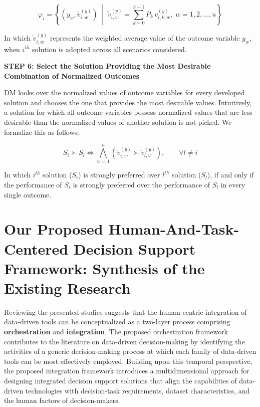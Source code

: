\documentclass{sfuthesis}
\begin{document}
\begin{equation}
\varphi_i
=
\left\{
(y_w,\tilde{v}_{i,w}^{(y)})
\;\middle|\;
\tilde{v}_{i,w}^{(y)}
=
\sum_{k=0}^{h-1}
P_k\,v_{i,k,w}^{(y)},
\;
w=1,2,\ldots,u
\right\}
\end{equation}

In which $\tilde{v}_{i,w}^{(y)}$ represents the weighted average value of the outcome variable $y_w$, when $i^{th}$ solution is adopted across all scenarios considered.

\textbf{STEP 6: Select the Solution Providing the Most Desirable Combination of
Normalized Outcomes}

DM looks over the normalized values of outcome variables for every developed solution
and chooses the one that provides the most desirable values. Intuitively, a solution for which all outcome variables possess normalized values that are less desirable than the normalized values of another solution is not picked. We formalize this as follows:

\begin{equation}
S_i \succ S_l
\iff
\bigwedge_{w=1}^{u}
\left(
\tilde{v}_{i,w}^{(y)}
\succ
\tilde{v}_{l,w}^{(y)}
\right),
\qquad
\forall l\neq i
\end{equation}

In which $i^{th}$ solution ($S_i$) is strongly preferred over $l^{th}$ solution ($S_l$), if and only if the performance of $S_i$ is strongly preferred over the performance of $S_l$ in every single outcome.


\section{Our Proposed Human-And-Task-Centered Decision Support Framework: Synthesis of the Existing Research}
Reviewing the presented studies suggests that the human-centric integration of data-driven tools can be conceptualized as a two-layer process comprising \textbf{orchestration} and \textbf{integration}. The proposed orchestration framework contributes to the literature on data-driven decision-making by identifying the activities of a generic decision-making process at which each family of data-driven tools can be most effectively employed. Building upon this temporal perspective, the proposed integration framework introduces a multidimensional approach for designing integrated decision support solutions that align the capabilities of data-driven technologies with decision-task requirements, dataset characteristics, and the human factors of decision-makers.
\end{document}
